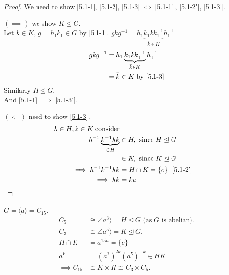 \begin{proof}
  We need to show \ref{5.1-1}, \ref{5.1-2}, \ref{5.1-3} $\iff$ \ref{5.1-1'}, \ref{5.1-2'}, \ref{5.1-3'}.

  $(\implies)$ we show $K \trianglelefteq G$.\\
  Let $k \in K$, $g = h_1 k_1 \in G$ by \ref{5.1-1}.
  $g k g^{-1} = h_1 \underbrace{k_1 k k_1^{-1}}_{\bar{k} \in K} h_1^{-1}$
  \begin{align*}
    g k g^{-1} &= h_1 \underbrace{k_1 k k_1^{-1}}_{\bar{k} \in K} h_1^{-1} \\
    &= \bar{k} \in K \text{ by } \ref{5.1-3}
  \end{align*} 
  Similarly $H \trianglelefteq G$. \\
  And \ref{5.1-1} $\implies$ \ref{5.1-3'}.

  $(\Longleftarrow)$ need to show \ref{5.1-3}.
  \begin{align*}
    h \in H, k \in K \text{ consider} \\
    h^{-1} \underbrace{k^{-1} h k}_{\in H} &\in H, \text{ since } H \trianglelefteq G \\
    &\in K, \text{ since } K \trianglelefteq G \\
    \implies h^{-1}k^{-1} h k &= H \cap K = \{ e \} \ \ \ref{5.1-2'} \\
    \implies hk &= kh 
  \end{align*} 
\end{proof} 

\begin{example}
  $G = \langle a \rangle = C_{15}$.
  \begin{align*}
    C_5 &\cong \angle a^3 \rangle = H \trianglelefteq G \text{ (as $G$ is abelian)}. \\
    C_3 &\cong \angle a^5 \rangle = K \trianglelefteq G. \\
    H \cap K &= a^{15n} = \{ e \} \\
    a^k &= (a^3)^{2k} (a^5)^{-k} \in HK \\
    \implies C_{15} &\cong K \times H \cong C_3 \times C_5.
  \end{align*} 
\end{example} 
